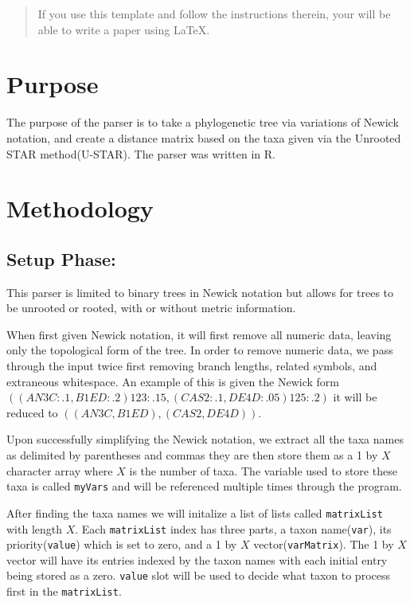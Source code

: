 \documentclass{article}
\begin{document}
\title{}
 
\author{Jesse Zhang}
 

 
\maketitle %
 
\begin{abstract}
If you use this template and follow the instructions therein,
your will be able to write a paper using LaTeX.
\end{abstract}
 
\section{Purpose}

The purpose of the parser is to take a phylogenetic tree via variations of Newick notation, and create a distance matrix based on the taxa given via the Unrooted STAR method(U-STAR). The parser was written in R. 

\section{Methodology}
 
\subsection{Setup Phase:}

This parser is limited to binary trees in Newick notation but allows for trees to be unrooted or rooted, with or without metric information.

When first given Newick notation, it will first remove all numeric data, leaving only the topological form of the tree. In order to remove numeric data, we pass through the input twice first removing branch lengths, related symbols, and extraneous whitespace. An example of this is given the Newick form $((AN3C:.1,B1ED:.2)123:.15,(CAS2:.1,DE4D:.05 )125:.2)$ it will be reduced to $((AN3C,B1ED),(CAS2,DE4D))$. 

Upon successfully simplifying the Newick notation, we extract all the taxa names as delimited by parentheses and commas they are then store them as a 1 by $X$ character array where $X$ is the number of taxa. The variable used to store these taxa is called {\tt myVars} and will be referenced multiple times through the program. 

After finding the taxa names we will initalize a list of lists called {\tt matrixList} with length $X$. Each {\tt matrixList} index has three parts, a taxon name({\tt var}), its priority({\tt value}) which is set to zero, and a 1 by $X$ vector({\tt varMatrix}). The 1 by $X$ vector will have its entries indexed by the taxon names with each initial entry being stored as a zero. {\tt value} slot will be used to decide what taxon to process first in the {\tt matrixList}.
\end{document}
